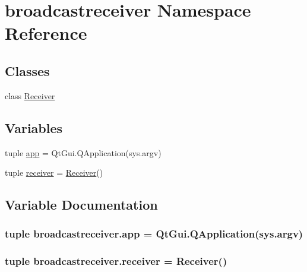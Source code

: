 \hypertarget{namespacebroadcastreceiver}{}\section{broadcastreceiver Namespace Reference}
\label{namespacebroadcastreceiver}
\subsection*{Classes}
\begin{DoxyCompactItemize}
\item 
class \hyperlink{classbroadcastreceiver_1_1Receiver}{Receiver}
\end{DoxyCompactItemize}
\subsection*{Variables}
\begin{DoxyCompactItemize}
\item 
tuple \hyperlink{namespacebroadcastreceiver_ae1188bd7e68a0f28a77cfc5e4707f301}{app} = Qt\+Gui.\+Q\+Application(sys.\+argv)
\item 
tuple \hyperlink{namespacebroadcastreceiver_af11fbc95b7d2ee66568db88fd6700781}{receiver} = \hyperlink{classbroadcastreceiver_1_1Receiver}{Receiver}()
\end{DoxyCompactItemize}


\subsection{Variable Documentation}
\hypertarget{namespacebroadcastreceiver_ae1188bd7e68a0f28a77cfc5e4707f301}{}
\subsubsection[{app}]{\setlength{\rightskip}{0pt plus 5cm}tuple broadcastreceiver.\+app = Qt\+Gui.\+Q\+Application(sys.\+argv)}\label{namespacebroadcastreceiver_ae1188bd7e68a0f28a77cfc5e4707f301}
\hypertarget{namespacebroadcastreceiver_af11fbc95b7d2ee66568db88fd6700781}{}
\subsubsection[{receiver}]{\setlength{\rightskip}{0pt plus 5cm}tuple broadcastreceiver.\+receiver = {\bf Receiver}()}\label{namespacebroadcastreceiver_af11fbc95b7d2ee66568db88fd6700781}
